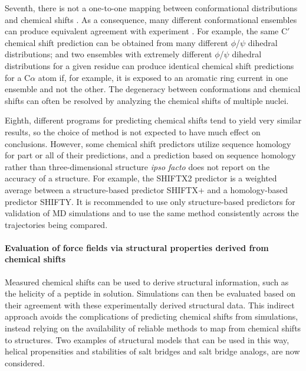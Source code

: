 \documentclass[9pt,review]{livecoms}
\begin{document}
Seventh, there is not a one-to-one mapping between conformational distributions and chemical shifts \cite{ozenne2012mapping}. As a consequence, many different conformational ensembles can produce equivalent agreement with experiment \cite{wood_secondary_2011,virtanen_heterogeneous_2020,shrestha_full_2021}.
For example, the same C$'$ chemical shift prediction can be obtained from many different $\phi$/$\psi$ dihedral distributions; and two ensembles with extremely different $\phi$/$\psi$ dihedral distributions for a given residue can produce identical chemical shift predictions for a C$\alpha$ atom if, for example, it is exposed to an aromatic ring current in one ensemble and not the other.
The degeneracy between conformations and chemical shifts can often be resolved by analyzing the chemical shifts of multiple nuclei.

Eighth, different programs for predicting chemical shifts tend to yield very similar results, so the choice of method is not expected to have much effect on conclusions.
However, some chemical shift predictors utilize sequence homology for part or all of their predictions, and a prediction based on sequence homology rather than three-dimensional structure \emph{ipso facto} does not report on the accuracy of a structure.
For example, the SHIFTX2 predictor is a weighted average between a structure-based predictor SHIFTX+ and a homology-based predictor SHIFTY.
It is recommended to use only structure-based predictors for validation of MD simulations and to use the same method consistently across the trajectories being compared.

\paragraph{Evaluation of force fields via structural properties derived from chemical shifts}
\label{sub3:derived-chemical-shifts}

Measured chemical shifts can be used to derive structural information, such as the helicity of a peptide in solution.
Simulations can then be evaluated based on their agreement with these experimentally derived structural data.
This indirect approach avoids the complications of predicting chemical shifts from simulations, instead relying on the availability of reliable methods to map from chemical shifts to structures.
Two examples of structural models that can be used in this way, helical propensities and stabilities of salt bridges and salt bridge analogs, are now considered.
\end{document}
